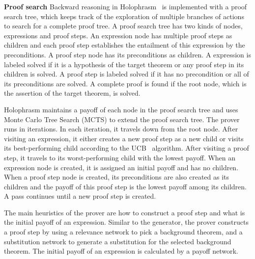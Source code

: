 \documentclass{article}
\begin{document}
\noindent\textbf{Proof search} Backward reasoning in Holophrasm~\cite{whalen2016holophrasm} is implemented with a proof search tree, which keeps track of the exploration of multiple branches of actions to search for a complete proof tree.
A proof search tree has two kinds of nodes, expressions and proof steps.
An expression node has multiple proof steps as children and each proof step 
establishes the entailment of this expression by the preconditions.
A proof step node has its preconditions as children.
A expression is labeled solved 
if it is a hypothesis of the target theorem or
any proof step in its children is solved. 
A proof step is labeled solved if it
has no precondition or all of its preconditions 
are solved.
A complete proof is found if the 
root node, which is the assertion of the target theorem,
is solved.

Holophrasm maintains a payoff of each node in the proof search tree and uses Monte Carlo Tree Search (MCTS) to extend the proof search tree.
The prover runs in iterations.
In each iteration, it travels down from the root node.
After visiting an expression, it either creates a new proof step as a new child 
or visits its best-performing child
according to the UCB~\citep{kocsis2006bandit} algorithm.
After visiting a proof step, 
it travels to its worst-performing child with the lowest payoff. 
When an expression node is created, 
it is assigned an initial payoff and has no children.
When a proof step node is created, 
its preconditions are also created as its children and the payoff of this proof step is the lowest payoff among its children. 
A pass continues until a new proof step is created. 

The main heuristics of the prover
are how to construct a proof step and what is the initial payoff of an expression.
Similar to the generator,
the prover constructs a proof step by using a relevance network
to pick a background theorem,
and a substitution network 
to generate a substitution for the selected background theorem.
The initial payoff of an expression is calculated by a payoff network.
\end{document}
